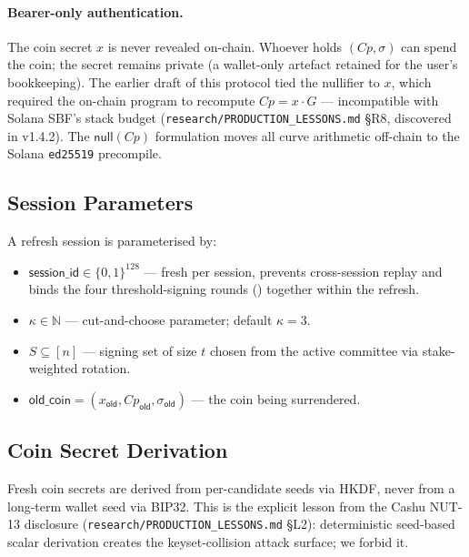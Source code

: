 \paragraph{Bearer-only authentication.} The coin secret $x$ is never revealed on-chain. Whoever holds $(Cp, \sigma)$ can spend the coin; the secret remains private (a wallet-only artefact retained for the user's bookkeeping). The earlier draft of this protocol tied the nullifier to $x$, which required the on-chain program to recompute $Cp = x \cdot G$ — incompatible with Solana SBF's stack budget (\texttt{research/PRODUCTION\_LESSONS.md} §R8, discovered in v1.4.2). The $\mathsf{null}(Cp)$ formulation moves all curve arithmetic off-chain to the Solana \texttt{ed25519} precompile.

\subsection{Session Parameters}
\label{sec:refresh-params}

A refresh session is parameterised by:
\begin{itemize}[leftmargin=2em,itemsep=0pt]
  \item $\mathsf{session\_id} \in \{0,1\}^{128}$ --- fresh per session, prevents cross-session replay and binds the four threshold-signing rounds () together within the refresh.
  \item $\kappa \in \mathbb{N}$ --- cut-and-choose parameter; default $\kappa = 3$.
  \item $S \subseteq [n]$ --- signing set of size $t$ chosen from the active committee via stake-weighted rotation.
  \item $\mathsf{old\_coin} = (x_{\mathsf{old}}, Cp_{\mathsf{old}}, \sigma_{\mathsf{old}})$ --- the coin being surrendered.
\end{itemize}

\subsection{Coin Secret Derivation}
\label{sec:refresh-derivation}

Fresh coin secrets are derived from per-candidate seeds via HKDF, never from a long-term wallet seed via BIP32. This is the explicit lesson from the Cashu NUT-13 disclosure (\texttt{research/PRODUCTION\_LESSONS.md} §L2): deterministic seed-based scalar derivation creates the keyset-collision attack surface; we forbid it.

